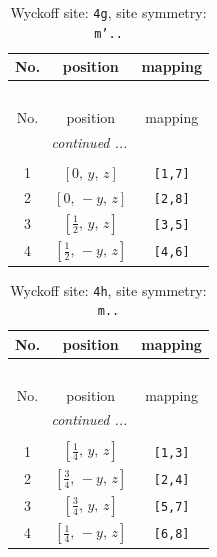 \documentclass[fleqn,8pt]{jsarticle}
\begin{document}
\renewcommand{\arraystretch}{1.2}
\begin{longtable}{ccc}
\caption{Wyckoff site: {\tt 4g}, site symmetry: {\tt m'..}}
 \\
 \hline \hline
No. & position & mapping \\ \hline \endfirsthead

\multicolumn{2}{l}{\tablename\ \thetable{}} \\
 \hline \hline
No. & position & mapping \\ \hline \endhead

 \hline \hline
\multicolumn{2}{r}{\footnotesize\it continued ...} \\ \endfoot

 \hline \hline
\multicolumn{2}{r}{} \\ \endlastfoot

1 & $\left[ 0,\, y,\, z \right]$ & {\tt [1,7]} \\ \hline
2 & $\left[ 0,\, - y,\, z \right]$ & {\tt [2,8]} \\ \hline
3 & $\left[ \frac{1}{2},\, y,\, z \right]$ & {\tt [3,5]} \\ \hline
4 & $\left[ \frac{1}{2},\, - y,\, z \right]$ & {\tt [4,6]} \\
\end{longtable}
\renewcommand{\arraystretch}{1.2}
\begin{longtable}{ccc}
\caption{Wyckoff site: {\tt 4h}, site symmetry: {\tt m..}}
 \\
 \hline \hline
No. & position & mapping \\ \hline \endfirsthead

\multicolumn{2}{l}{\tablename\ \thetable{}} \\
 \hline \hline
No. & position & mapping \\ \hline \endhead

 \hline \hline
\multicolumn{2}{r}{\footnotesize\it continued ...} \\ \endfoot

 \hline \hline
\multicolumn{2}{r}{} \\ \endlastfoot

1 & $\left[ \frac{1}{4},\, y,\, z \right]$ & {\tt [1,3]} \\ \hline
2 & $\left[ \frac{3}{4},\, - y,\, z \right]$ & {\tt [2,4]} \\ \hline
3 & $\left[ \frac{3}{4},\, y,\, z \right]$ & {\tt [5,7]} \\ \hline
4 & $\left[ \frac{1}{4},\, - y,\, z \right]$ & {\tt [6,8]} \\
\end{longtable}
\end{document}
